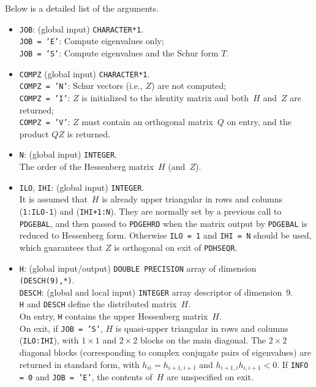 \documentclass{article}
\begin{document}
Below is a detailed list of the arguments.
\begin{itemize}
\item \texttt{JOB}: (global input) \texttt{CHARACTER*1}.\\
\texttt{JOB = 'E'}: Compute eigenvalues only;\\
\texttt{JOB = 'S'}: Compute eigenvalues and the Schur form $T$.

\item \texttt{COMPZ} (global input) \texttt{CHARACTER*1}.\\
\texttt{COMPZ = 'N'}: Schur vectors (i.e., $Z$) are not computed;\\
\texttt{COMPZ = 'I'}: $Z$ is initialized to the identity matrix and both~$H$
and~$Z$ are returned;\\
\texttt{COMPZ = 'V'}: $Z$ must contain an orthogonal matrix~$Q$ on entry, and
the product $QZ$ is returned.

\item \texttt{N}: (global input) \texttt{INTEGER}.\\
The order of the Hessenberg matrix~$H$ (and~$Z$).

\item \texttt{ILO}, \texttt{IHI}: (global input) \texttt{INTEGER}.\\
It is assumed that~$H$ is already upper triangular in rows and columns
(\texttt{1:ILO-1}) and (\texttt{IHI+1:N}).
They are normally set by a previous call to \texttt{PDGEBAL}, and then passed
to \texttt{PDGEHRD} when the matrix output by \texttt{PDGEBAL} is reduced to
Hessenberg form.
Otherwise \texttt{ILO = 1} and \texttt{IHI = N} should be used, which
guarantees that $Z$ is orthogonal on exit of \texttt{PDHSEQR}.

\item \texttt{H}: (global input/output) \texttt{DOUBLE PRECISION} array of
dimension \texttt{(DESCH(9),*)}.\\
\texttt{DESCH}: (global and local input) \texttt{INTEGER} array descriptor of
dimension~9.\\
\texttt{H} and \texttt{DESCH} define the distributed matrix~$H$.\\
On entry, \texttt{H} contains the upper Hessenberg matrix~$H$.\\
On exit, if \texttt{JOB = 'S'}, $H$ is quasi-upper triangular in rows and
columns (\texttt{ILO:IHI}), with $1\times1$ and $2\times2$ blocks on the main
diagonal.
The $2\times2$ diagonal blocks (corresponding to complex conjugate pairs of
eigenvalues) are returned in standard form, with $h_{ii}=h_{i+1,i+1}$ and
$h_{i+1,i}h_{i,i+1}<0$.
If \texttt{INFO = 0} and \texttt{JOB = 'E'}, the contents of~$H$ are
unspecified on exit.


\end{itemize}
\end{document}
